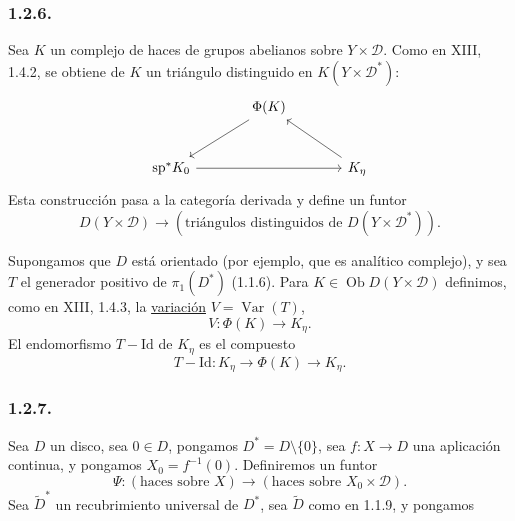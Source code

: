 \subsubsection*{1.2.6.}
Sea $K$ un complejo de haces de grupos abelianos sobre
$Y\times\mathcal D$. Como en XIII, 1.4.2, se obtiene de $K$ un triángulo
distinguido en $K(Y\times\mathcal D^*)$:
\[
\begin{tikzcd}[row sep=large, column sep=large]
{} & \Phi(K) \arrow[dl] & {} \\
\mathrm{sp}^*K_0 \arrow[rr] & {} & K_\eta \arrow[ul]
\end{tikzcd}
\]
Esta construcción pasa a la categoría derivada y define un funtor
\[
D(Y\times\mathcal D)
\longrightarrow
(\text{triángulos distinguidos de }D(Y\times\mathcal D^*)).
\]

Supongamos que $D$ está orientado (por ejemplo, que es analítico complejo), y
sea $T$ el generador positivo de $\pi_1(D^*)$ (1.1.6). Para
$K\in\operatorname{Ob}D(Y\times\mathcal D)$ definimos, como en XIII, 1.4.3,
la \underline{variación} $V=\operatorname{Var}(T)$,
\[
V:\Phi(K)\longrightarrow K_\eta.
\]
El endomorfismo $T-\mathrm{Id}$ de $K_\eta$ es el compuesto
\[
T-\mathrm{Id}:K_\eta\longrightarrow\Phi(K)
\longrightarrow K_\eta.
\]

\subsubsection*{1.2.7.}
Sea $D$ un disco, sea $0\in D$, pongamos $D^*=D\setminus\{0\}$, sea
$f:X\longrightarrow D$ una aplicación continua, y pongamos
$X_0=f^{-1}(0)$. Definiremos un funtor
\[
\Psi:(\text{haces sobre }X)
\longrightarrow(\text{haces sobre }X_0\times\mathcal D).
\]
Sea $\widetilde D^*$ un recubrimiento universal de $D^*$, sea
$\widetilde D$ como en 1.1.9, y pongamos

\pageoriginale

